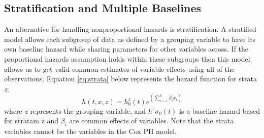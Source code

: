 \documentclass[12pt,letterpaper]{article}
\begin{document}
\subsection{Stratification and Multiple Baselines}
An alternative for handling nonproportional hazards is stratification.  A stratified model allows each subgroup of data as defined by a grouping variable to have its own baseline hazard while sharing parameters for other variables across. If the proportional hazards assumption holds within these subgroups then this model allows us to get valid common estimates of variable effects using all of the observations. Equation \ref{eq:strata} below represents the hazard function for strata {\it z};
\begin{equation}
	\label{eq:strata}
	h(t,x,z)=h^z_0(t)e^{(\sum_{i=1}^{k}\beta_ix_i)}
\end{equation}
where $z$ represents the grouping variable, and $h^z\sigma_0(t)$ is a baseline hazard based for stratam z and $\beta_i$ are common effects of variables. Note that the strata variables cannot be the variables in the Cox PH model.

\end{document}
